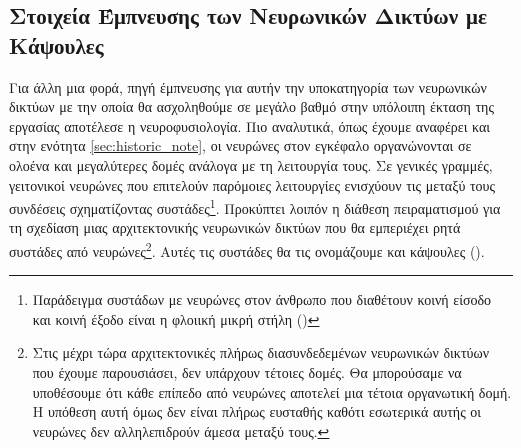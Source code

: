 \subsection{Στοιχεία Έμπνευσης των Νευρωνικών Δικτύων με Κάψουλες}
Για άλλη μια φορά, πηγή έμπνευσης για αυτήν την υποκατηγορία των νευρωνικών δικτύων με την οποία θα ασχοληθούμε σε μεγάλο βαθμό στην υπόλοιπη έκταση της εργασίας αποτέλεσε η νευροφυσιολογία. Πιο αναλυτικά, όπως έχουμε αναφέρει και στην ενότητα \ref{sec:historic_note}, οι νευρώνες στον εγκέφαλο οργανώνονται σε ολοένα και μεγαλύτερες δομές ανάλογα με τη λειτουργία τους. Σε γενικές γραμμές, γειτονικοί νευρώνες που επιτελούν παρόμοιες λειτουργίες ενισχύουν τις μεταξύ τους συνδέσεις σχηματίζοντας συστάδες\footnote{Παράδειγμα συστάδων με νευρώνες στον άνθρωπο που διαθέτουν κοινή είσοδο και κοινή έξοδο είναι η φλοιική μικρή στήλη ()}. Προκύπτει λοιπόν η διάθεση πειραματισμού για τη σχεδίαση μιας αρχιτεκτονικής νευρωνικών δικτύων που θα εμπεριέχει ρητά συστάδες από νευρώνες\footnote{Στις μέχρι τώρα αρχιτεκτονικές πλήρως διασυνδεδεμένων νευρωνικών δικτύων που έχουμε παρουσιάσει, δεν υπάρχουν τέτοιες δομές. Θα μπορούσαμε να υποθέσουμε ότι κάθε επίπεδο από νευρώνες αποτελεί μια τέτοια οργανωτική δομή. Η υπόθεση αυτή όμως δεν είναι πλήρως ευσταθής καθότι εσωτερικά αυτής οι νευρώνες δεν αλληλεπιδρούν άμεσα μεταξύ τους.}. Αυτές τις συστάδες θα τις ονομάζουμε και κάψουλες ().\par

